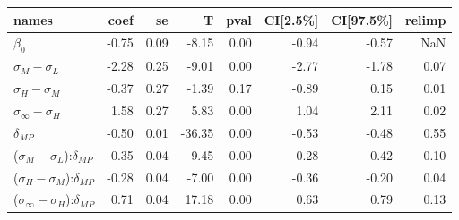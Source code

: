 \begin{tabular}{lrrrrrrr}
\toprule
                                         names &  coef &   se &      T &  pval &  CI[2.5\%] &  CI[97.5\%] &  relimp \\
\midrule
                                   $\beta_{0}$ & -0.75 & 0.09 &  -8.15 &  0.00 &      -0.94 &       -0.57 &     NaN \\
                     $\sigma_{M} - \sigma_{L}$ & -2.28 & 0.25 &  -9.01 &  0.00 &      -2.77 &       -1.78 &    0.07 \\
                     $\sigma_{H} - \sigma_{M}$ & -0.37 & 0.27 &  -1.39 &  0.17 &      -0.89 &        0.15 &    0.01 \\
                $\sigma_{\infty} - \sigma_{H}$ &  1.58 & 0.27 &   5.83 &  0.00 &       1.04 &        2.11 &    0.02 \\
                                 $\delta_{MP}$ & -0.50 & 0.01 & -36.35 &  0.00 &      -0.53 &       -0.48 &    0.55 \\
     ($\sigma_{M} - \sigma_{L}$):$\delta_{MP}$ &  0.35 & 0.04 &   9.45 &  0.00 &       0.28 &        0.42 &    0.10 \\
     ($\sigma_{H} - \sigma_{M}$):$\delta_{MP}$ & -0.28 & 0.04 &  -7.00 &  0.00 &      -0.36 &       -0.20 &    0.04 \\
($\sigma_{\infty} - \sigma_{H}$):$\delta_{MP}$ &  0.71 & 0.04 &  17.18 &  0.00 &       0.63 &        0.79 &    0.13 \\
\bottomrule
\end{tabular}
